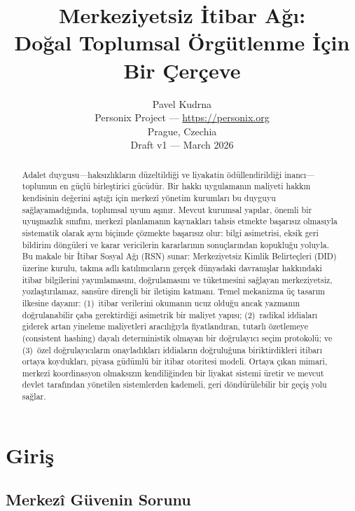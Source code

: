 \documentclass[11pt,a4paper,twocolumn]{article}
\title{\textbf{Merkeziyetsiz İtibar Ağı:\\Doğal Toplumsal Örgütlenme İçin Bir Çerçeve}}
\author{Pavel Kudrna\\Personix Project --- \url{https://personix.org}\\Prague, Czechia\\Draft v1 --- March 2026}
\date{}
\begin{document}
\maketitle

\begin{abstract}
Adalet duygusu---haksızlıkların düzeltildiği ve liyakatin ödüllendirildiği inancı---toplumun en güçlü birleştirici gücüdür. Bir hakkı uygulamanın maliyeti hakkın kendisinin değerini aştığı için merkezî yönetim kurumları bu duyguyu sağlayamadığında, toplumsal uyum aşınır. Mevcut kurumsal yapılar, önemli bir uyuşmazlık sınıfını, merkezî planlamanın kaynakları tahsis etmekte başarısız olmasıyla sistematik olarak aynı biçimde çözmekte başarısız olur: bilgi asimetrisi, eksik geri bildirim döngüleri ve karar vericilerin kararlarının sonuçlarından kopukluğu yoluyla. Bu makale bir İtibar Sosyal Ağı (RSN) sunar: Merkeziyetsiz Kimlik Belirteçleri (DID) üzerine kurulu, takma adlı katılımcıların gerçek dünyadaki davranışlar hakkındaki itibar bilgilerini yayımlamasını, doğrulamasını ve tüketmesini sağlayan merkeziyetsiz, yozlaştırılamaz, sansüre dirençli bir iletişim katmanı. Temel mekanizma üç tasarım ilkesine dayanır: (1)~itibar verilerini okumanın ucuz olduğu ancak yazmanın doğrulanabilir çaba gerektirdiği asimetrik bir maliyet yapısı; (2)~radikal iddiaları giderek artan yineleme maliyetleri aracılığıyla fiyatlandıran, tutarlı özetlemeye (consistent hashing) dayalı deterministik olmayan bir doğrulayıcı seçim protokolü; ve (3)~özel doğrulayıcıların onayladıkları iddiaların doğruluğuna biriktirdikleri itibarı ortaya koydukları, piyasa güdümlü bir itibar otoritesi modeli. Ortaya çıkan mimari, merkezî koordinasyon olmaksızın kendiliğinden bir liyakat sistemi üretir ve mevcut devlet tarafından yönetilen sistemlerden kademeli, geri döndürülebilir bir geçiş yolu sağlar.
\end{abstract}

\section{Giriş}

\subsection{Merkezî Güvenin Sorunu}
\end{document}
